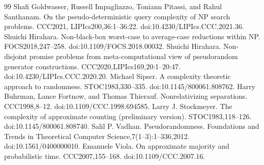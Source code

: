 \begin{thebibliography}{99}
 Shafi Goldwasser, Russell Impagliazzo, Toniann Pitassi, and Rahul Santhanam. On the pseudo-deterministic query complexity of NP search problems. CCC2021, LIPIcs200,36:1--36:22. doi:10.4230/LIPIcs.CCC.2021.36.
 Shuichi Hirahara. Non-black-box worst-case to average-case reductions within NP. FOCS2018,247--258. doi:10.1109/FOCS.2018.00032.
 Shuichi Hirahara. Non-disjoint promise problems from meta-computational view of pseudorandom generator constructions. CCC2020,LIPIcs169,20:1--20:47. doi:10.4230/LIPIcs.CCC.2020.20.
 Michael Sipser. A complexity theoretic approach to randomness. STOC1983,330--335. doi:10.1145/800061.808762.
 Harry Buhrman, Lance Fortnow, and Thomas Thierauf. Nonrelativizing separations. CCC1998,8--12. doi:10.1109/CCC.1998.694585.
 Larry J. Stockmeyer. The complexity of approximate counting (preliminary version). STOC1983,118--126. doi:10.1145/800061.808740.
 Salil P. Vadhan. Pseudorandomness. Foundations and Trends in Theoretical Computer Science,7(1--3):1--336,2012. doi:10.1561/0400000010.
 Emanuele Viola. On approximate majority and probabilistic time. CCC2007,155--168. doi:10.1109/CCC.2007.16.
\end{thebibliography}
